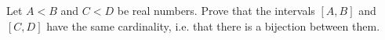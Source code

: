 Let $A<B$ and $C<D$ be real numbers. Prove that the intervals $[A,B]$ and $[C,D]$ have the same cardinality, i.e. that there is a bijection between them.
